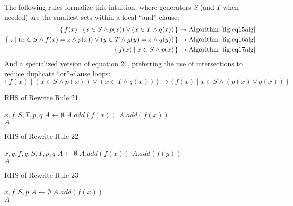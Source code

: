 \documentclass{article}
\newcommand{\Set}[2]{%
  \{\, #1 \mid #2 \, \}%
}
\begin{document}
The following rules formalize this intuition, where generators $S$ (and $T$ when needed) are the smallest sets within a local ``and''-clause:
\begin{align}
  \Set{f(x)}{(x \in S \land p(x)) \lor (x \in T \land q(x))} &\rightarrow \text{Algorithm~\ref{fig:eq15alg}}\\
  \Set{z}{(x \in S \land f(x) = z \land p(x)) \lor (y \in T \land g(y) = z \land q(y))} &\rightarrow \text{Algorithm~\ref{fig:eq16alg}}\\
  \Set{f(x)}{x \in S \land p(x)} &\rightarrow \text{Algorithm~\ref{fig:eq17alg}}
\end{align}
And a specialized version of equation 21, preferring the use of intersections to reduce duplicate ``or''-clause loops:
\begin{equation}
  \Set{f(x)}{(x \in S \land p(x)) \lor (x \in T \land q(x))} \rightarrow \Set{f(x)}{x \in S \land (p(x) \lor q(x))}
\end{equation}

\begin{algorithm}
  \caption{RHS of Rewrite Rule 21}
  \begin{algorithmic}
    \Require $x,f,S,T,p,q$
    \State $A \gets \emptyset$
        \State $A.add(f(x))$
      \EndIf
    \EndFor
        \State $A.add(f(x))$
      \EndIf
    \EndFor\\
  \Return $A$
  \end{algorithmic}
  \label{fig:eq15alg}
\end{algorithm}

\begin{algorithm}
  \caption{RHS of Rewrite Rule 22}
  \begin{algorithmic}
    \Require $x,y,f,g,S,T,p,q$
    \State $A \gets \emptyset$
        \State $A.add(f(x))$
      \EndIf
    \EndFor
        \State $A.add(f(y))$
      \EndIf
    \EndFor\\
  \Return $A$
  \end{algorithmic}
  \label{fig:eq16alg}
\end{algorithm}

\begin{algorithm}
  \caption{RHS of Rewrite Rule 23}
  \begin{algorithmic}
    \Require $x,f,S,p$
    \State $A \gets \emptyset$
        \State $A.add(f(x))$
      \EndIf
    \EndFor\\
  \Return $A$
  \end{algorithmic}
  \label{fig:eq17alg}
\end{algorithm}
\end{document}
